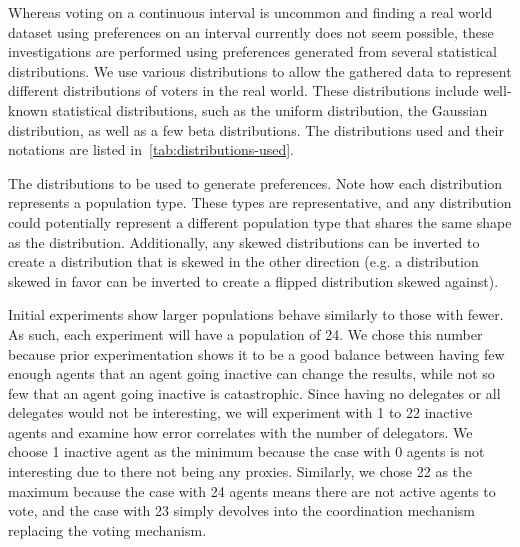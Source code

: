 Whereas voting on a continuous interval is uncommon and finding a real world dataset
using preferences on an interval currently does not seem possible, these investigations
are performed using preferences generated from several statistical distributions.
We use various distributions to allow the gathered data to represent
different distributions of voters in the real world.
These distributions include well-known statistical distributions, such as the uniform
distribution, the Gaussian distribution, as well as a few beta distributions.
The distributions used and their notations are listed
in~\autoref{tab:distributions-used}.

\begin{table}[!htbp]
    \renewcommand{\arraystretch}{1.3}

    \caption{
        The distributions to be used to generate preferences.
        Note how each distribution represents a population type.
        These types are representative, and any distribution could potentially
        represent a different population type that shares the same shape as the
        distribution.
        Additionally, any skewed distributions can be inverted to create a
        distribution that is skewed in the other direction (e.g. a distribution
        skewed in favor can be inverted to create a flipped distribution skewed
        against).
    }
    \label{tab:distributions-used}

    \centering
    
\end{table}

Initial experiments show larger populations behave similarly to those with fewer.
As such, each experiment will have a population of 24.
We chose this number because prior experimentation shows it to be a good balance
between having few enough agents that an agent going inactive can change the
results, while not so few that an agent going inactive is catastrophic.
Since having no delegates or all delegates would not be interesting, we will
experiment with 1 to 22 inactive agents and examine how error correlates with
the number of delegators.
We choose 1 inactive agent as the minimum because the case with 0 agents is not
interesting due to there not being any proxies.
Similarly, we chose 22 as the maximum because the case with 24 agents means there are
not active agents to vote, and the case with 23 simply devolves into the coordination
mechanism replacing the voting mechanism.

